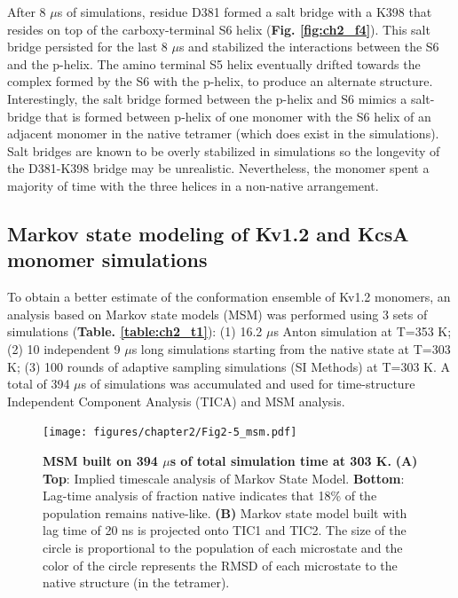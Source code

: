 After 8 $\mu$s of simulations, residue D381 formed a salt bridge with a K398 that resides on top of the carboxy-terminal S6 helix (\textbf{Fig. \ref{fig:ch2_f4}}). This salt bridge persisted for the last 8 $\mu$s and stabilized the interactions between the S6 and the p-helix. The amino terminal S5 helix eventually drifted towards the complex formed by the S6 with the p-helix, to produce an alternate structure. Interestingly, the salt bridge formed between the p-helix and S6 mimics a salt-bridge that is formed between p-helix of one monomer with the S6 helix of an adjacent monomer in the native tetramer (which does exist in the simulations). Salt bridges are known to be overly stabilized in simulations \citep{ahmed2018} so the longevity of the D381-K398 bridge may be unrealistic. Nevertheless, the monomer spent a majority of time with the three helices in a non-native arrangement.

\subsection{Markov state modeling of Kv1.2 and KcsA monomer simulations}
To obtain a better estimate of the conformation ensemble of Kv1.2 monomers, an analysis based on Markov state models (MSM) was performed using 3 sets of simulations (\textbf{Table. \ref{table:ch2_t1}}): (1) 16.2 $\mu$s Anton simulation at T=353 K; (2) 10 independent 9 $\mu$s long simulations starting from the native state at T=303 K; (3) 100 rounds of adaptive sampling simulations (SI Methods) at T=303 K. A total of 394 $\mu$s of simulations was accumulated and used for time-structure Independent Component Analysis (TICA) and MSM analysis. \citep{molgedey1994, noe2015, noe2016, perezHernandez2013, schwantes2013}

\begin{figure}[!ht]
\begin{center}
	\texttt{[image: figures/chapter2/Fig2-5\_msm.pdf]}
\end{center}
	\caption{\textbf{MSM built on 394 $\mu$s of total simulation time at 303 K.} \textbf{(A) Top}: Implied timescale analysis of Markov State Model. \textbf{Bottom}: Lag-time analysis of fraction native indicates that 18\% of the population remains native-like. \textbf{(B)} Markov state model built with lag time of 20 ns is projected onto TIC1 and TIC2. The size of the circle is proportional to the population of each microstate and the color of the circle represents the RMSD of each microstate to the native structure (in the tetramer).}
	\label{fig:ch2_f5}
\end{figure}

